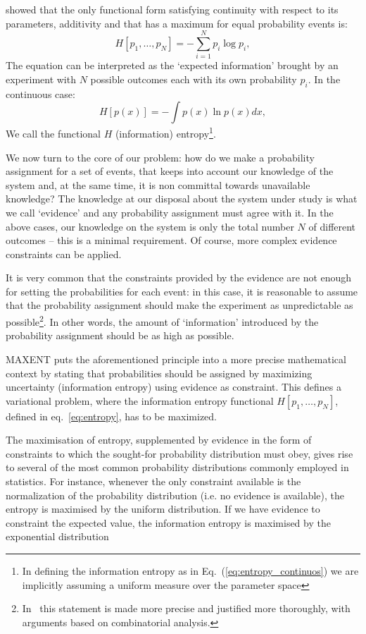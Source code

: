 \documentclass{aa}
\begin{document}
\citet{Shannon} showed that the only functional form satisfying continuity with respect to its parameters, additivity and that has a maximum for equal probability events is:
\begin{equation}\label{eq:entropy}
    H[p_1, \dots, p_N] = - \sum_{i = 1}^N p_i\log{p_i},
\end{equation}
The equation can be interpreted as the `expected information' brought by an experiment with $N$ possible outcomes each with its own probability $p_i$.
In the continuous case:
\begin{equation} \label{eq:entropy_continuos}
    H[p(x)] = - \int p(x)\ln p(x) dx,
\end{equation}
We call the functional $H$ (information) entropy\footnote{In defining the information entropy as in Eq.~(\ref{eq:entropy_continuos}) we are implicitly assuming a uniform measure over the parameter space}.

We now turn to the core of our problem: how do we make a probability assignment for a set of events, that keeps into account our knowledge of the system and, at the same time, it is non committal towards unavailable knowledge?
The knowledge at our disposal about the system under study is what we call `evidence' and any probability assignment must agree with it.
In the above cases, our knowledge on the system is only the total number $N$ of different outcomes -- this is a minimal requirement. Of course, more complex evidence constraints can be applied.

It is very common that the constraints provided by the evidence are not enough for setting the probabilities for each event: in this case, it is reasonable to assume that the probability assignment should make the experiment as unpredictable as possible\footnote{
In~\citet{Jaynes_MAXENT} this statement is made more precise and justified more thoroughly, with arguments based on combinatorial analysis.
}.
In other words, the amount of `information' introduced by the probability assignment should be as high as possible.

MAXENT puts the aforementioned principle into a more precise mathematical context by stating that probabilities should be assigned by maximizing uncertainty (information entropy) using evidence as constraint. 
This defines a variational problem, where the information entropy functional $H\left[p_1, \dots, p_N\right]$, defined in eq.~\eqref{eq:entropy}, has to be maximized. 

The maximisation of entropy, supplemented by evidence in the form of constraints to which the sought-for probability distribution must obey,
gives rise to several of the most common probability distributions commonly employed in statistics. For instance, whenever the only constraint available is the normalization of the probability distribution (i.e. no evidence is available), the entropy is maximised by the uniform distribution. 
If we have evidence to constraint the expected value, the information entropy is maximised by the exponential distribution
\end{document}
